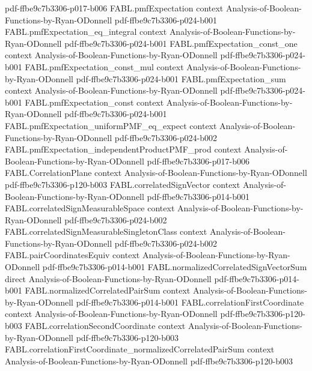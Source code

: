 \begin{theorem}
  {pdf-ffbe9c7b3306-p017-b006}
\proofstep
  {FABL.pmfExpectation}
  {context}
  {Analysis-of-Boolean-Functions-by-Ryan-ODonnell}
  {pdf-ffbe9c7b3306-p024-b001}
\proofstep
  {FABL.pmfExpectation_eq_integral}
  {context}
  {Analysis-of-Boolean-Functions-by-Ryan-ODonnell}
  {pdf-ffbe9c7b3306-p024-b001}
\proofstep
  {FABL.pmfExpectation_const_one}
  {context}
  {Analysis-of-Boolean-Functions-by-Ryan-ODonnell}
  {pdf-ffbe9c7b3306-p024-b001}
\proofstep
  {FABL.pmfExpectation_const_mul}
  {context}
  {Analysis-of-Boolean-Functions-by-Ryan-ODonnell}
  {pdf-ffbe9c7b3306-p024-b001}
\proofstep
  {FABL.pmfExpectation_sum}
  {context}
  {Analysis-of-Boolean-Functions-by-Ryan-ODonnell}
  {pdf-ffbe9c7b3306-p024-b001}
\proofstep
  {FABL.pmfExpectation_const}
  {context}
  {Analysis-of-Boolean-Functions-by-Ryan-ODonnell}
  {pdf-ffbe9c7b3306-p024-b001}
\proofstep
  {FABL.pmfExpectation_uniformPMF_eq_expect}
  {context}
  {Analysis-of-Boolean-Functions-by-Ryan-ODonnell}
  {pdf-ffbe9c7b3306-p024-b002}
\proofstep
  {FABL.pmfExpectation_independentProductPMF_prod}
  {context}
  {Analysis-of-Boolean-Functions-by-Ryan-ODonnell}
  {pdf-ffbe9c7b3306-p017-b006}
\proofstep
  {FABL.CorrelationPlane}
  {context}
  {Analysis-of-Boolean-Functions-by-Ryan-ODonnell}
  {pdf-ffbe9c7b3306-p120-b003}
\proofstep
  {FABL.correlatedSignVector}
  {context}
  {Analysis-of-Boolean-Functions-by-Ryan-ODonnell}
  {pdf-ffbe9c7b3306-p014-b001}
\proofstep
  {FABL.correlatedSignMeasurableSpace}
  {context}
  {Analysis-of-Boolean-Functions-by-Ryan-ODonnell}
  {pdf-ffbe9c7b3306-p024-b002}
\proofstep
  {FABL.correlatedSignMeasurableSingletonClass}
  {context}
  {Analysis-of-Boolean-Functions-by-Ryan-ODonnell}
  {pdf-ffbe9c7b3306-p024-b002}
\proofstep
  {FABL.pairCoordinatesEquiv}
  {context}
  {Analysis-of-Boolean-Functions-by-Ryan-ODonnell}
  {pdf-ffbe9c7b3306-p014-b001}
\proofstep
  {FABL.normalizedCorrelatedSignVectorSum}
  {direct}
  {Analysis-of-Boolean-Functions-by-Ryan-ODonnell}
  {pdf-ffbe9c7b3306-p014-b001}
\proofstep
  {FABL.normalizedCorrelatedPairSum}
  {context}
  {Analysis-of-Boolean-Functions-by-Ryan-ODonnell}
  {pdf-ffbe9c7b3306-p014-b001}
\proofstep
  {FABL.correlationFirstCoordinate}
  {context}
  {Analysis-of-Boolean-Functions-by-Ryan-ODonnell}
  {pdf-ffbe9c7b3306-p120-b003}
\proofstep
  {FABL.correlationSecondCoordinate}
  {context}
  {Analysis-of-Boolean-Functions-by-Ryan-ODonnell}
  {pdf-ffbe9c7b3306-p120-b003}
\proofstep
  {FABL.correlationFirstCoordinate_normalizedCorrelatedPairSum}
  {context}
  {Analysis-of-Boolean-Functions-by-Ryan-ODonnell}
  {pdf-ffbe9c7b3306-p120-b003}
\proofstep

\end{theorem}
